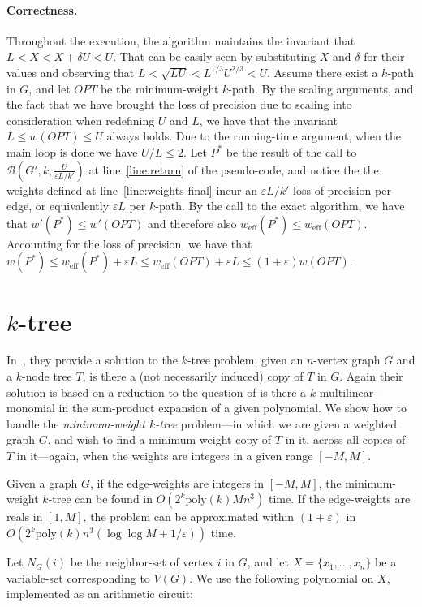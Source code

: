\documentclass{llncs}
\newcommand{\poly}{\mathrm{poly}}
\newcommand{\weff}{w_{\mathrm{eff}}}
\begin{document}
\paragraph{Correctness.} 
Throughout the execution, the algorithm maintains the invariant that $L < X < X+\delta U< U$. That can be easily seen by substituting $X$ and $\delta$ for their values and observing that $L < \sqrt{LU} < L^{1/3}U^{2/3} < U$. 
Assume there exist a $k$-path in $G$, and let $OPT$ be the minimum-weight $k$-path. By the scaling arguments, and the fact that we have brought the loss of precision due to scaling into consideration when redefining $U$ and $L$, we have that the invariant $L \leq w(OPT) \leq U$ always holds. Due to the running-time argument, when the main loop is done we have $U/L \leq 2$. Let $P^*$ be the result of the call to  
$\mathcal{B}(G',k,  \frac{U}{\varepsilon L/k'})$ 
at line~\ref{line:return} of the pseudo-code, and notice the the weights defined at line~\ref{line:weights-final} incur an $\varepsilon L /k'$ loss of precision per edge, or equivalently $\varepsilon L $ per $k$-path. By the call to the exact algorithm, we have that $w'(P^*) \leq w'(OPT)$ 
and therefore also $\weff(P^*) \leq \weff(OPT)$. Accounting for the loss of precision, we have that $w(P^*) \leq \weff(P^*) + \varepsilon L \leq \weff(OPT) + \varepsilon L \leq (1+\varepsilon)w(OPT)$.



\section{$k$-tree}\label{sec:tree}
In~\cite{KW09}, they provide a solution to the $k$-tree problem: given an $n$-vertex graph $G$ and a $k$-node tree $T$, is there a (not necessarily induced) copy of $T$ in $G$. Again their solution is based on a reduction to the question of is there a $k$-multilinear-monomial in the sum-product expansion of a given polynomial. We show how to handle the \emph{minimum-weight $k$-tree} problem---in which we are given a weighted graph $G$, and wish to find a minimum-weight copy of $T$ in it, across all copies of $T$ in it---again, when the weights are integers in a given range $[-M,M]$. 

\begin{theorem}\label{thr:tree}
Given a graph $G$, if the edge-weights are integers in $[-M,M]$, the minimum-weight $k$-tree can be found in $\tilde{O}(2^k \poly(k) M n^3)$ time. If the edge-weights are reals in $[1,M]$, the problem can be approximated within $(1+\varepsilon)$ in $\tilde{O}(2^k \poly(k) n^3(\log\log M + 1/\varepsilon))$ time.
\end{theorem}
Let $N_G(i)$ be the neighbor-set of vertex $i$ in $G$, and let $X=\{x_1,\ldots,x_n\}$ be a variable-set corresponding to $V(G)$. We use the following polynomial on $X$, implemented as an arithmetic circuit:
\end{document}
